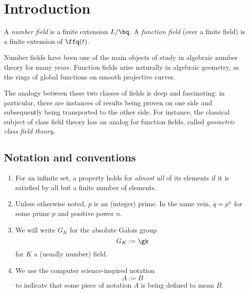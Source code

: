 \chapter*{Introduction}

A \textit{number field} is a finite extension $L/\bq$. A \textit{function field}
(over a finite field) is a finite extension of $\ffq(t)$.

Number fields have been one of the main objects of study in algebraic number
theory for many years. Function fields arise naturally in algebraic geometry, as
the rings of global functions on smooth projective curves.

The analogy between these two classes of fields is deep and fascinating: in
particular, there are instances of results being proven on one side and
subsequently being transported to the other side. For instance, the classical
subject of class field theory has an analog for function fields, called
\textit{geometric class field theory}.

\section*{Notation and conventions}
\begin{enumerate}
\item For an infinite set, a property holds for \textit{almost all} of its
  elements if it is satisfied by all but a finite number of elements.
\item Unless otherwise noted, $p$ is an (integer) prime. In the same vein, $q=
  p^n$ for some prime $p$ and positive power $n$.
\item We will write $G_K$ for the absolute Galois group
  \[ G_K := \gk \]
  for $K$ a (usually number) field.
\item We use the computer science-inspired notation
  \[ A := B \]
  to indicate that some piece of notation $A$ is being defined to mean $B$.
\end{enumerate}
